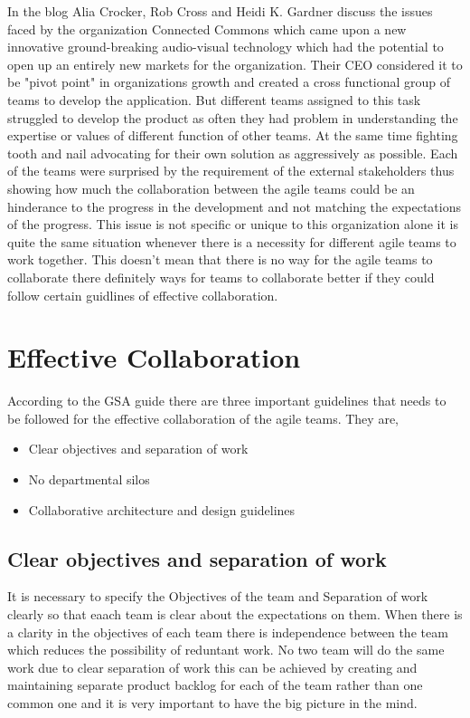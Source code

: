 \documentclass[sigconf]{acmart}
\begin{document}
In the blog \cite{Alia01} Alia Crocker, Rob Cross and Heidi K. Gardner discuss the issues faced by the organization Connected Commons which came upon a new innovative ground-breaking audio-visual technology which had the potential to open up an entirely new markets for the organization. Their CEO considered it to be "pivot point" in organizations growth and created a cross functional group of teams to develop the application. But different teams assigned to this task struggled to develop the product as often they had problem in understanding the expertise or values of different function of other teams. At the same time fighting tooth and nail advocating for their own solution as aggressively as possible. Each of the teams were surprised by the requirement of the external stakeholders thus showing how much the collaboration between the agile teams could be an hinderance to the progress in the development and not matching the expectations of the progress. This issue is not specific or unique to this organization alone it is quite the same situation whenever there is a necessity for different agile teams to work together.  This doesn't mean that there is no way for the agile teams to collaborate there definitely ways for teams to collaborate better if they could follow certain guidlines of effective collaboration.

\section{Effective Collaboration}

According to the GSA guide \cite{Gsa01} there are three important guidelines that needs to be followed for the effective collaboration of the agile teams. They are,

\begin{itemize}
  \item Clear objectives and separation of work
  \item No departmental silos
  \item Collaborative architecture and design guidelines
\end{itemize}
\subsection{Clear objectives and separation of work}

It is necessary to specify the Objectives of the team and Separation of work clearly so that eaach team is clear about the expectations on them. When there is a clarity in the objectives of each team there is independence between the team which reduces the possibility of reduntant work. No two team will do the same work due to clear separation of work this can be achieved by creating and maintaining separate product backlog for each of the team rather than one common one and it is very important to have the big picture in the mind. 
\end{document}
